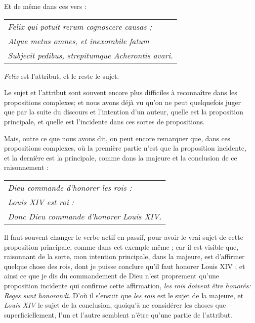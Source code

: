 Et de même dans ces vers :
	\begin{tabularx}{\textwidth}{X}
		\emph{Felix qui potuit rerum cognoscere causas ;} \\
		\emph{Atque metus omnes, et inexorabile fatum} \\
		\emph{Subjecit pedibus, strepitumque Acherontis avari.} \\
	\end{tabularx}
\emph{Felix} est l'attribut, et le reste le sujet.

Le sujet et l'attribut sont souvent encore plus difficiles à reconnaître dans les propositions complexes; et nous avons déjà vu qu'on ne peut quelquefois juger que par la suite du discours et l'intention d'un auteur, quelle est la proposition principale, et quelle est l'incidente dans ces sortes de propositions.

Mais, outre ce que nous avons dit, on peut encore remarquer que, dans ces propositions complexes, où la première partie n'est que la proposition incidente, et la dernière est la principale, comme dans la majeure et la conclusion de ce raisonnement :
	\begin{tabularx}{\textwidth}{X}
		\emph{Dieu commande d'honorer les rois :} \\
		\emph{Louis XIV est roi :} \\
		\emph{Donc Dieu commande d'honorer Louis XIV.} \\
	\end{tabularx}

Il faut souvent changer le verbe actif en passif, pour avoir le vrai sujet de cette proposition principale, comme dans cet exemple même ; car il est visible que, raisonnant de la sorte, mon intention principale, dans la majeure, est d'affirmer quelque chose des rois, dont je puisse conclure qu'il faut honorer Louis XIV ; et ainsi ce que je dis du commandement de Dieu n'est proprement qu'une proposition incidente qui confirme cette affirmation, \emph{les rois doivent être honorés: Reges sunt honorandi}. D'où il s'ensuit que \emph{les rois} est le sujet de la majeure, et \emph{Louis XIV} le sujet de la conclusion, quoiqu'à ne considérer les choses que superficiellement, l'un et l'autre semblent n'être qu'une partie de l'attribut.

